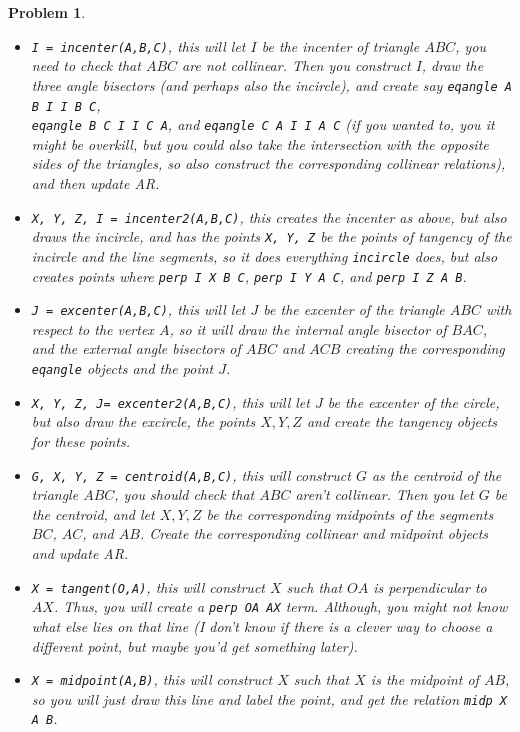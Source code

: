 \documentclass{article}
\newtheorem{problem}{Problem}
\begin{document}
\begin{problem}
\begin{itemize}
    \item \verb|I = incenter(A,B,C)|, this will let $I$ be the incenter of triangle $ABC$, you need to check that $ABC$ are not collinear. Then you construct $I$, draw the three angle bisectors (and perhaps also the incircle), and create say \verb|eqangle A B I I B C|,\\ \verb|eqangle B C I I C A|, and \verb|eqangle C A I I A C| (if you wanted to, you it might be overkill, but you could also take the intersection with the opposite sides of the triangles, so also construct the corresponding collinear relations), and then update AR.

    \item \verb|X, Y, Z, I = incenter2(A,B,C)|, this creates the incenter as above, but also draws the incircle, and has the points \verb|X, Y, Z| be the points of tangency of the incircle and the line segments, so it does everything \verb|incircle| does, but also creates points where \verb|perp I X B C|, \verb|perp I Y A C|, and \verb|perp I Z A B|. 

    \item \verb|J = excenter(A,B,C)|, this will let $J$ be the excenter of the triangle $ABC$ with respect to the vertex $A$, so it will draw the internal angle bisector of $BAC$, and the external angle bisectors of $ABC$ and $ACB$ creating the corresponding \verb|eqangle| objects and the point $J$. 

    \item \verb|X, Y, Z, J= excenter2(A,B,C)|, this will let $J$ be the excenter of the circle, but also draw the excircle, the points $X, Y, Z$ and create the tangency objects for these points. 

    \item \verb|G, X, Y, Z = centroid(A,B,C)|, this will construct $G$ as the centroid of the triangle $ABC$, you should check that $ABC$ aren't collinear. Then you let $G$ be the centroid, and let $X,Y,Z$ be the corresponding midpoints of the segments $BC$, $AC$, and $AB$. Create the corresponding collinear and midpoint objects and update AR. 

    \item \verb|X = tangent(O,A)|, this will construct $X$ such that $OA$ is perpendicular to $AX$. Thus, you will create a \verb|perp OA AX| term. Although, you might not know what else lies on that line (I don't know if there is a clever way to choose a different point, but maybe you'd get something later). 

    \item \verb|X = midpoint(A,B)|, this will construct $X$ such that $X$ is the midpoint of $AB$, so you will just draw this line and label the point, and get the relation \verb|midp X A B|.


\end{itemize}
\end{problem}
\end{document}
